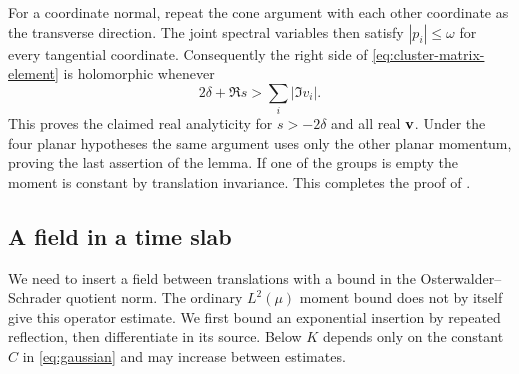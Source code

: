 For a coordinate normal, repeat the cone argument with each other
coordinate as the transverse direction. The joint spectral variables
then satisfy $|p_i|\leq\omega$ for every tangential coordinate.
Consequently the right side of \eqref{eq:cluster-matrix-element} is
holomorphic whenever
\begin{equation}
 2\delta+\Re s>\sum_i|\Im v_i|.
\end{equation}
This proves the claimed real analyticity for $s>-2\delta$ and all
real $\mathbf{v}$. Under the four planar hypotheses the same argument uses
only the other planar momentum, proving the last assertion of the
lemma. If one of the groups is empty the moment is constant by
translation invariance. This completes the proof of
.

\subsection{A field in a time slab}\label{subsec:slab}

We need to insert a field between translations with a bound in the
Osterwalder--Schrader quotient norm. The ordinary $L^2(\mu)$ moment
bound does not by itself give this operator estimate. We first bound
an exponential insertion by repeated reflection, then differentiate
in its source. Below $K$ depends only on the constant $C$ in
\eqref{eq:gaussian} and may increase between estimates.

